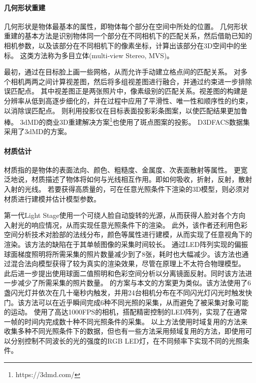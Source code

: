 \paragraph{几何形状重建}
几何形状是物体最基本的属性，即物体每个部分在空间中所处的位置。
几何形状重建的基本方法是识别物体同一个部分在不同相机下的匹配关系，然后借助已知的相机参数，以及该部分在不同相机下的像素坐标，计算出该部分在3D空间中的坐标。
这类方法称为多目立体(multi-view Stereo, MVS)。

最初，\citet{PFM}通过在目标脸上画一些网格，从而允许手动建立格点间的匹配关系。
\citet{ss_geo}对多个相机两两之间计算视差图，然后将多组视差图进行融合，并通过约束进一步排除误匹配点。
其中视差图正是两张照片中，像素级别的匹配关系。视差图的构建是分辨率从低到高逐步细化的，并在过程中应用了平滑性、唯一性和顺序性的约束，以消除误匹配点。
\citet{DEP}则利用投影仪在目标表面投影彩条图案，以使匹配结果更加鲁棒。
3dMD的商业3D重建解决方案\footnote{https://3dmd.com/}也使用了斑点图案的投影。
D3DFACS\citep{D3DFACS}数据集采用了3dMD的方案。

\paragraph{材质估计}
材质指的是物体的表面法向、颜色、粗糙度、金属度、次表面散射等属性。
更宽泛地说，材质描述了物体将如何与光线相互作用。即如何吸收，折射，反射，散射入射的光线。
若要获得高质量的，可在任意光照条件下渲染的3D模型，则必须对材质进行建模并估计模型参数。

第一代Light Stage\citep{light_stage}使用一个可绕人脸自动旋转的光源，从而获得人脸对各个方向入射光的响应情况，从而实现任意光照条件下的渲染。
此外，该作者还利用色彩空间分析技术\cite{temporal_color}对脸部的法线分布，颜色等属性进行建模，从而实现了任意视角下的渲染。该方法的缺陷在于其单帧图像的采集时间较长。
\citet{MaHPCWD07}通过LED阵列实现的偏振球面梯度照明将所需采集的照片数量减少到了8张，耗时也大幅减少。该方法也通过混合法向模型获得了较为真实的渲染效果，尽管在原理上不太符合物理模型。
此后\citet{KampourisZG18}进一步提出使用球面二值照明和色彩空间分析\cite{MallickZKB05}以分离镜面反射。同时该方法进一步减少了所需采集的照片数量。
\citet{FyffeGTGD16}的方案与本文的方案更为类似。该方法使用了6盏闪光灯并依次在几十毫秒内触发，并用24台相机分布在不同闪光灯闪光时触发快门。该方法可以在近乎瞬间完成6种不同光照的采集，从而避免了被采集对象可能的运动。
\citet{ZhangZZLCYXY22}使用了高达1000FPS的相机，搭配精密控制的LED阵列，实现了在通常一帧的时间内完成数十种不同光照条件的采集。
以上方法使用时域复用的方法来收集多种不同光照条件下的数据，但也有一些方法\citep{FyffeD15,MekaHPZFFKYBDDB19}采用频域复用的方法，即使用可以分别控制不同波长的光的强度的RGB LED灯，在不同频率下实现不同的光照条件。


